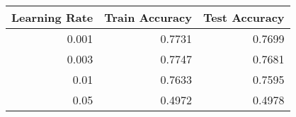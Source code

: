 \begin{tabular}{|r||r|r|}
\hline
Learning Rate & Train Accuracy & Test Accuracy \\
\hline
0.001 & 0.7731 & 0.7699 \\
0.003 & 0.7747 & 0.7681 \\
0.01 & 0.7633 & 0.7595 \\
0.05 & 0.4972 & 0.4978 \\
\hline
\end{tabular}
